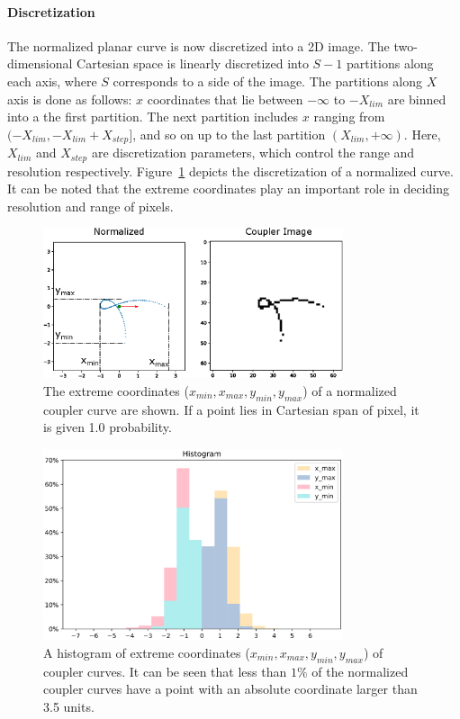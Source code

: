 \paragraph{Discretization}
The normalized planar curve is now discretized into a 2D image. The two-dimensional Cartesian space is linearly discretized into $S-1$ partitions along each axis, where $S$ corresponds to a side of the image.
The partitions along $X$ axis is done as follows:
$x$ coordinates that lie between $-\infty$ to $-X_{lim}$ are binned into a the first partition. The next partition includes $x$ ranging from $(-X_{lim}, -X_{lim} + X_{step}]$, and so on up to the last partition $(X_{lim}, +\infty)$. Here, $X_{lim}$ and $X_{step}$ are discretization parameters, which control the range and resolution respectively. Figure~\ref{fig_curve_discretization} depicts the discretization of a normalized curve. It can be noted that the extreme coordinates play an important role in deciding resolution and range of pixels. 


\begin{figure}
\centering
\includegraphics[width=250pt]{idetc-20/figure/fig_curve_discretization.eps}
  \caption{The extreme coordinates ($x_{min}, x_{max}, y_{min}, y_{max}$) of a normalized coupler curve are shown. If a point lies in Cartesian span of pixel, it is given 1.0 probability.}
\label{fig_curve_discretization}
\end{figure}


\begin{figure}
\centering
\includegraphics[width=250pt]{idetc-20/figure/fig_histogram.eps}
  \caption{A histogram of extreme coordinates ($x_{min}, x_{max}, y_{min}, y_{max}$) of coupler curves. It can be seen that less than $1\%$ of the normalized coupler curves have a point with an absolute coordinate larger than 3.5 units.}
\label{fig_histogram}
\end{figure}




